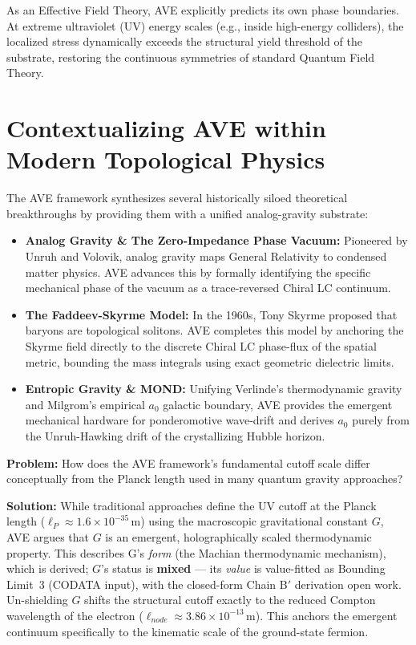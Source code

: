 As an Effective Field Theory, AVE explicitly predicts its own phase boundaries. At extreme ultraviolet (UV) energy scales (e.g., inside high-energy colliders), the localized stress dynamically exceeds the structural yield threshold of the substrate, restoring the continuous symmetries of standard Quantum Field Theory.

\section*{Contextualizing AVE within Modern Topological Physics}
The AVE framework synthesizes several historically siloed theoretical breakthroughs by providing them with a unified analog-gravity substrate:
\begin{itemize}
    \item \textbf{Analog Gravity \& The Zero-Impedance Phase Vacuum:} Pioneered by Unruh and Volovik, analog gravity maps General Relativity to condensed matter physics. AVE advances this by formally identifying the specific mechanical phase of the vacuum as a trace-reversed Chiral LC continuum.
    \item \textbf{The Faddeev-Skyrme Model:} In the 1960s, Tony Skyrme proposed that baryons are topological solitons. AVE completes this model by anchoring the Skyrme field directly to the discrete Chiral LC phase-flux of the spatial metric, bounding the mass integrals using exact geometric dielectric limits.
    \item \textbf{Entropic Gravity \& MOND:} Unifying Verlinde's thermodynamic gravity and Milgrom's empirical $a_0$ galactic boundary, AVE provides the emergent mechanical hardware for ponderomotive wave-drift and derives $a_0$ purely from the Unruh-Hawking drift of the crystallizing Hubble horizon.
\end{itemize}

\begin{examplebox}
\textbf{Problem:} How does the AVE framework's fundamental cutoff scale differ conceptually from the Planck length used in many quantum gravity approaches?

\textbf{Solution:} While traditional approaches define the UV cutoff at the Planck length ($\ell_P \approx 1.6 \times 10^{-35}\,\text{m}$) using the macroscopic gravitational constant $G$, AVE argues that $G$ is an emergent, holographically scaled thermodynamic property.
This describes G's \emph{form} (the Machian thermodynamic mechanism), which is derived; $G$'s status is \textbf{mixed} --- its \emph{value} is value-fitted as Bounding Limit~3 (CODATA input), with the closed-form Chain B$'$ derivation open work. Un-shielding $G$ shifts the structural cutoff exactly to the reduced Compton wavelength of the electron ($\ell_{node} \approx 3.86 \times 10^{-13}\,\text{m}$). This anchors the emergent continuum specifically to the kinematic scale of the ground-state fermion. 
\end{examplebox}

